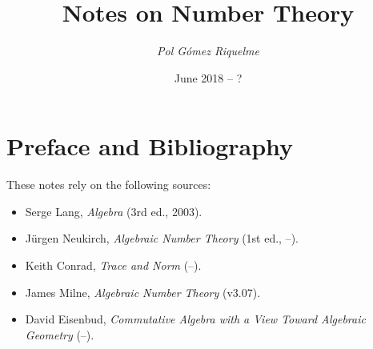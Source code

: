 \documentclass[12pt,oneside]{article}
\begin{document}
\title{Notes on Number Theory}
\author{\small\textit{Pol Gómez Riquelme}}
\date{June 2018 -- ?}
\maketitle

\tableofcontents
\pagebreak

\section*{Preface and Bibliography}

These notes rely on the following sources:
\begin{itemize}
	\item Serge Lang, \emph{Algebra} (3rd ed., 2003).
	\item Jürgen Neukirch, \emph{Algebraic Number Theory} (1st ed., --).
	\item Keith Conrad, \emph{Trace and Norm} (--).
	\item James Milne, \emph{Algebraic Number Theory} (v3.07).
	\item David Eisenbud, \emph{Commutative Algebra with a View Toward Algebraic Geometry} (--).
\end{itemize}

\pagebreak






\end{document}
